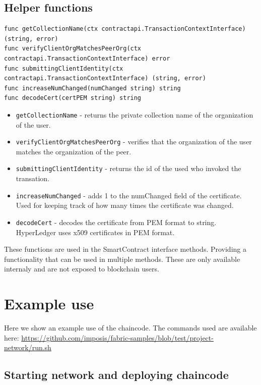 \documentclass[12pt]{article}
\begin{document}
\subsection{Helper functions}

\begin{lstlisting}[language=Golang]
func getCollectionName(ctx contractapi.TransactionContextInterface) (string, error)
func verifyClientOrgMatchesPeerOrg(ctx contractapi.TransactionContextInterface) error
func submittingClientIdentity(ctx contractapi.TransactionContextInterface) (string, error)
func increaseNumChanged(numChanged string) string
func decodeCert(certPEM string) string
\end{lstlisting}

\begin{itemize}
    \item \texttt{getCollectionName} - returns the private collection name of the organization of the user.
    \item \texttt{verifyClientOrgMatchesPeerOrg} - verifies that the organization of the user matches the organization of the peer.
    \item \texttt{submittingClientIdentity} - returns the id of the used who invoked the transation.
    \item \texttt{increaseNumChanged} - adds 1 to the numChanged field of the certificate. Used for keeping track of how many times the certificate was changed.
    \item \texttt{decodeCert} - decodes the certificate from PEM format to string. HyperLedger uses x509 certificates in PEM format.
\end{itemize}

These functions are used in the SmartContract interface methods. Providing a functionality that can be used in multiple methods. These are only available internaly and are not exposed to blockchain users.

\newpage

\section{Example use}

Here we show an example use of the chaincode. The commands used are available here: \url{https://github.com/imposis/fabric-samples/blob/test/project-network/run.sh}

\subsection{Starting network and deploying chaincode}
\end{document}

